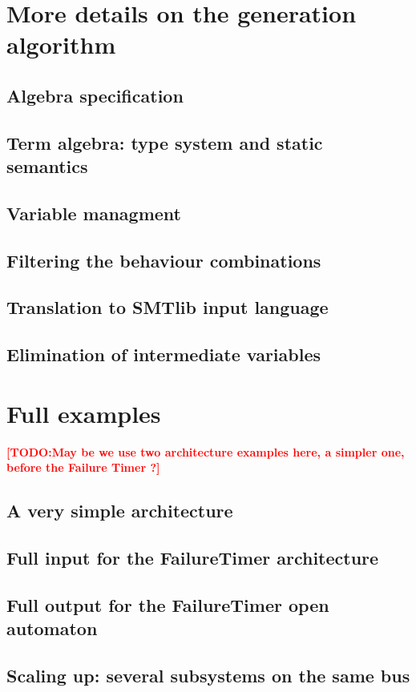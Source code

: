 \documentclass{lncs/llncs}
\newcommand{\TODO}[1]{\textcolor{red}{\textbf{[TODO:#1]}}}
\begin{document}
\appendix

\section{More details on the generation algorithm}
\subsection{Algebra specification}
\subsection{Term algebra: type system and static semantics}
\subsection{Variable managment}
\subsection{Filtering the behaviour combinations}
\subsection{Translation to SMTlib input language}
\subsection{Elimination of intermediate variables}

\section{Full examples}
\TODO{May be we use two architecture examples here, a simpler one,
  before the Failure Timer ?}
\subsection{A very simple architecture}
\subsection{Full input for the FailureTimer architecture}
\subsection{Full output for the FailureTimer open automaton}
\subsection{Scaling up: several subsystems on the same bus}
\end{document}
